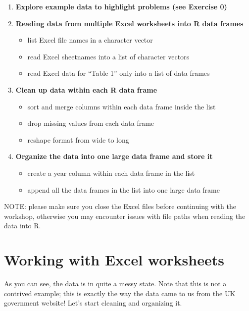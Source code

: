 \documentclass[]{book}
\providecommand{\tightlist}{%
  \setlength{\itemsep}{0pt}\setlength{\parskip}{0pt}}
\begin{document}
\begin{enumerate}
\def\labelenumi{\arabic{enumi}.}
\item
  \textbf{Explore example data to highlight problems (see Exercise 0)}
\item
  \textbf{Reading data from multiple Excel worksheets into R data frames}

  \begin{itemize}
  \tightlist
  \item
    list Excel file names in a character vector
  \item
    read Excel sheetnames into a list of character vectors
  \item
    read Excel data for ``Table 1'' only into a list of data frames
  \end{itemize}
\item
  \textbf{Clean up data within each R data frame}

  \begin{itemize}
  \tightlist
  \item
    sort and merge columns within each data frame inside the list
  \item
    drop missing values from each data frame
  \item
    reshape format from wide to long
  \end{itemize}
\item
  \textbf{Organize the data into one large data frame and store it}

  \begin{itemize}
  \tightlist
  \item
    create a year column within each data frame in the list
  \item
    append all the data frames in the list into one large data frame
  \end{itemize}
\end{enumerate}

NOTE: please make sure you close the Excel files before continuing with the
workshop, otherwise you may encounter issues with file paths when reading
the data into R.

\hypertarget{working-with-excel-worksheets}{%
\section{Working with Excel worksheets}\label{working-with-excel-worksheets}}

As you can see, the data is in quite a messy state. Note that this is
not a contrived example; this is exactly the way the data came to us
from the UK government website! Let's start cleaning and organizing
it.
\end{document}
